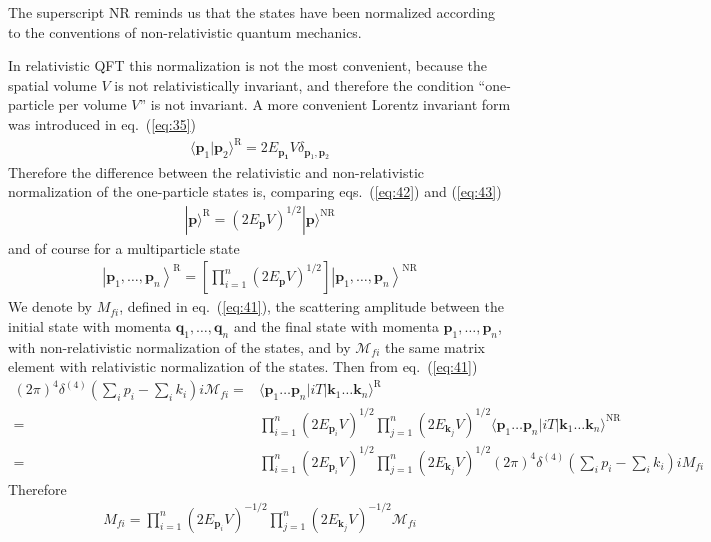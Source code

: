 The superscript NR reminds us that the states have been normalized
according to the conventions of non-relativistic quantum mechanics.

In relativistic QFT this normalization is not the most convenient, because
the spatial volume $V$ is not relativistically invariant, and therefore
the condition  ``one-particle per volume $V$'' is not invariant. A more convenient Lorentz invariant form was introduced in eq.~(\ref{eq:35})
\begin{align}
  \label{eq:43}
     \langle\mathbf{p}_1 |\mathbf{p}_2\rangle^{\text{R}}=
   2E_\mathbf{p_1}V\delta_{{\mathbf{p}_1},{\mathbf{p}_2}}
\end{align}
Therefore the difference between the relativistic and non-relativistic normalization
of the one-particle states is, comparing eqs.~(\ref{eq:42}) and (\ref{eq:43})
\begin{align}
|\mathbf{p}\rangle^{\text{R}}=
   \left(2E_\mathbf{p}V\right)^{1/2}|\mathbf{p}\rangle^{\text{NR}}
\end{align}
and of course for a multiparticle state
\begin{align}
  \left|\mathbf{p}_1,\ldots,\mathbf{p}_n\right\rangle^{\text{R}}=
\left[\prod_{i=1}^{n}\left(2E_\mathbf{p}V\right)^{1/2}\right]
  \left|\mathbf{p}_1,\ldots,\mathbf{p}_n\right\rangle^{\text{NR}}
\end{align}
We denote by $M_{fi}$, defined in eq.~(\ref{eq:41}), the scattering amplitude between the initial state with
momenta $\mathbf{q}_1,\ldots,\mathbf{q}_n$ and the final state with momenta $\mathbf{p}_1,\ldots,\mathbf{p}_n$, with non-relativistic normalization of the states, and by $\mathcal{M}_{fi}$ the same matrix element with relativistic normalization of the states. Then from  eq.~(\ref{eq:41})
\begin{align}
(2\pi)^4\delta^{(4)}\left(\sum_i p_i-\sum_i k_i\right)i \mathcal{M}_{fi}=&\langle\mathbf{p}_1\ldots\mathbf{p}_n|i T|\mathbf{k}_1\ldots\mathbf{k}_n\rangle^{\text{R}}\nonumber\\
=&\prod_{i=1}^{n}\left(2E_{\mathbf{p}_i}V\right)^{1/2}
\prod_{j=1}^{n}\left(2E_{\mathbf{k}_j}V\right)^{1/2}\langle\mathbf{p}_1\ldots\mathbf{p}_n|i T|\mathbf{k}_1\ldots\mathbf{k}_n\rangle^{\text{NR}}\nonumber\\
=&\prod_{i=1}^{n}\left(2E_{\mathbf{p}_i}V\right)^{1/2}
\prod_{j=1}^{n}\left(2E_{\mathbf{k}_j}V\right)^{1/2}(2\pi)^4\delta^{(4)}\left(\sum_i p_i-\sum_i k_i\right)i {M}_{fi}
\end{align}
Therefore
\begin{align}
\label{eq:44}
  M_{fi}=\prod_{i=1}^{n}\left(2E_{\mathbf{p}_i}V\right)^{-1/2}
\prod_{j=1}^{n}\left(2E_{\mathbf{k}_j}V\right)^{-1/2}\mathcal{M}_{fi}
\end{align}


